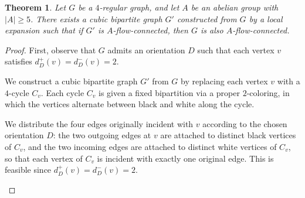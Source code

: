 \documentclass[a4paper,12pt]{article}
\theoremstyle{plain}
\newtheorem{theorem}{Theorem}[section]
\theoremstyle{definition}
\renewcommand\ge\geqslant
\begin{document}
\begin{theorem}
Let $G$ be a $4$-regular graph, and let $A$ be an abelian group with $|A|\ge 5$. There exists a cubic bipartite graph $G'$ constructed from $G$ by a local expansion such that if $G'$ is $A$-flow-connected, then $G$ is also $A$-flow-connected.
\end{theorem}

\begin{proof}
First, observe that $G$ admits an orientation $D$ such that each vertex $v$ satisfies $d^+_D(v)=d^-_D(v)=2$.

We construct a cubic bipartite graph $G'$ from $G$ by replacing each vertex $v$ with a $4$-cycle $C_v$. Each cycle $C_v$ is given a fixed bipartition via a proper $2$-coloring, in which the vertices alternate between black and white along the cycle.

We distribute the four edges originally incident with $v$ according to the chosen orientation $D$: the two outgoing edges at $v$ are attached to distinct black vertices of $C_v$, and the two incoming edges are attached to distinct white vertices of $C_v$, so that each vertex of $C_v$ is incident with exactly one original edge. This is feasible since $d^+_D(v)=d^-_D(v)=2$.

\begin{figure}[!h]
\centering
{}
\end{figure}
\end{proof}
\end{document}
